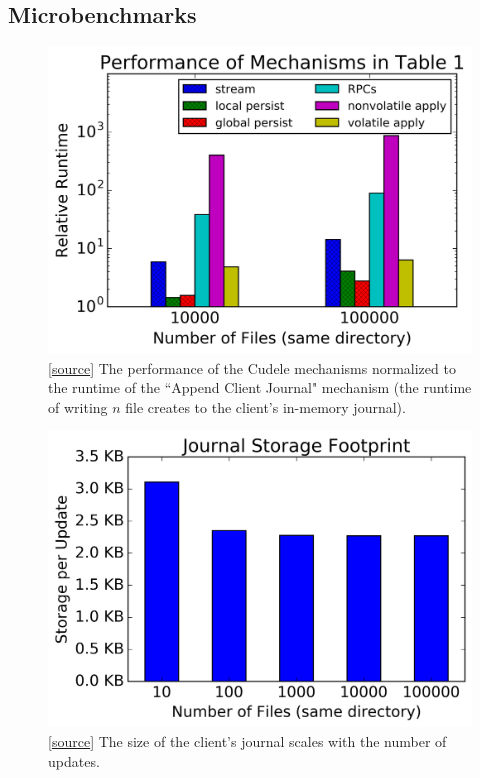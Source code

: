 \subsection{Microbenchmarks}
\begin{figure}[tb]
\centering
\includegraphics[width=1.0\linewidth]{graphs/slowdown-mechanisms.png}
\caption{
[\href{https://...}{source}]
The performance of the Cudele mechanisms normalized to the runtime of the
``Append Client Journal" mechanism (the runtime of writing \(n\) file creates
to the client's in-memory journal).  \label{fig:slowdown-mechanisms}}
\end{figure}

\begin{figure}[tb]
\centering
\includegraphics[width=1.0\linewidth]{graphs/behavior-journal-size.png}
\caption{
[\href{https://...}{source}]
The size of the client's journal scales with the number of
updates.\label{fig:behavior-journal-size}}
\end{figure}

